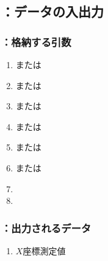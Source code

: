 \subsection{\MXIface：データの入出力}

\subsubsection{\MXIface：格納する引数}
\begin{enumerate}[label*=\sarrow]
\item \PMTopOutcutACWidth または\PMBottomOutcutACWidth
\item \PMTopEndACID または\PMBottomEndACID
\item \PMTopEndFaceInChamferLength または\PMBottomEndFaceInChamferLength
\item \PMTopOutcutAsideThickness または\PMBottomOutcutAsideThickness
\item \PMTopAlocationLength または\PMBottomAlocationLength
\item \PMTopReAlocationLength または\PMBottomReAlocationLength
\item \PMCenterCurvatureRadius
\item \PMPlatingThk
\end{enumerate}

\subsubsection{\MXIface：出力されるデータ}
\begin{enumerate}[label*=\sarrow]
\item \OutcutCenter$X$座標測定値
\end{enumerate}

